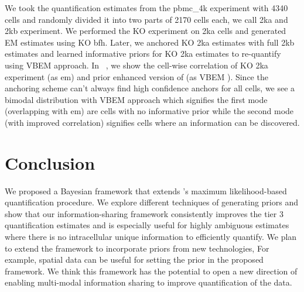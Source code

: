 We took the quantification estimates from the pbmc\_4k experiment with 4340 cells and randomly divided it into
two parts of 2170 cells each, we call 2ka and 2kb experiment. We performed the KO experiment on
2ka cells and generated \alevin EM estimates using KO bfh. Later, we anchored KO 2ka estimates 
with full 2kb estimates and learned informative priors for KO 2ka estimates to re-quantify using \alevin  VBEM 
approach. In ~, we show the cell-wise correlation of KO 2ka experiment (as em) and prior
enhanced version of \alevin (as  VBEM ). Since the anchoring scheme can't always find high confidence anchors for 
all cells, we see a bimodal distribution with VBEM approach which signifies the first mode (overlapping 
with em) are cells with no informative prior while the second mode (with improved correlation)
signifies cells where an information can be discovered.

\section{Conclusion}
We proposed a Bayesian framework that extends \alevin 's maximum likelihood-based 
quantification procedure. We explore different techniques of generating priors and show that our 
information-sharing framework consistently improves the tier 3 \dscrnaseq quantification estimates and 
is especially useful for highly ambiguous estimates where there is no intracellular unique information to 
efficiently quantify. We plan to extend the framework to incorporate priors from new 
technologies, For example, spatial data can be  useful for setting the prior in the proposed 
\alevin framework.  We think this framework has the potential to open a new direction of enabling 
multi-modal information sharing to improve quantification of the data.